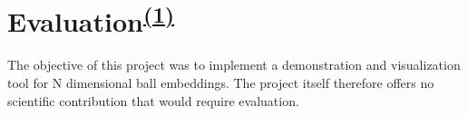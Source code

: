 \chapter[Evaluation]{Evaluation\textsuperscript{\hyperref[Jan]{(1)}}}
The objective of this project was to implement a demonstration and visualization tool for N dimensional ball embeddings. The project itself therefore offers no scientific contribution that would require evaluation.